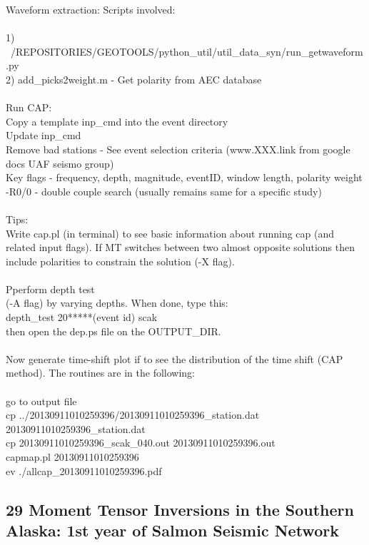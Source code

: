\documentclass[11pt,titlepage,fleqn]{article}
\begin{document}
Waveform extraction: 
Scripts involved:
\\
\\
1) ~/REPOSITORIES/GEOTOOLS/python\_util/util\_data\_syn/run\_getwaveform.py \\
2) add\_picks2weight.m - Get polarity from AEC database
\\
\\
Run CAP:\\
Copy a template inp\_cmd into the event directory\\
Update inp\_cmd \\
Remove bad stations - See event selection criteria (www.XXX.link from google docs UAF seismo group)\\
Key flags - frequency, depth, magnitude, eventID, window length, polarity weight\\
-R0/0 - double couple search (usually remains same for a specific study)
\\
\\
Tips:\\
Write cap.pl (in terminal) to see basic information about running cap (and related input flags).
If MT switches between two almost opposite solutions then include polarities to constrain the solution (-X flag).
\\
\\
Pperform depth test\\
 (-A flag) by varying depths. When done, type this: \\
depth\_test 20*****(event id) scak \\
then open the dep.ps file on the OUTPUT\_DIR.\\
\\
Now generate time-shift plot if to see the distribution of the time shift (CAP method). The routines are in the following:
\\ \\
go to output file \\
cp ../20130911010259396/20130911010259396\_station.dat  20130911010259396\_station.dat\\
cp 20130911010259396\_scak\_040.out 20130911010259396.out \\
capmap.pl 20130911010259396 \\
ev ./allcap\_20130911010259396.pdf \\



\subsection*{29 Moment Tensor Inversions in the Southern Alaska: 1st year of Salmon Seismic Network}
\end{document}
